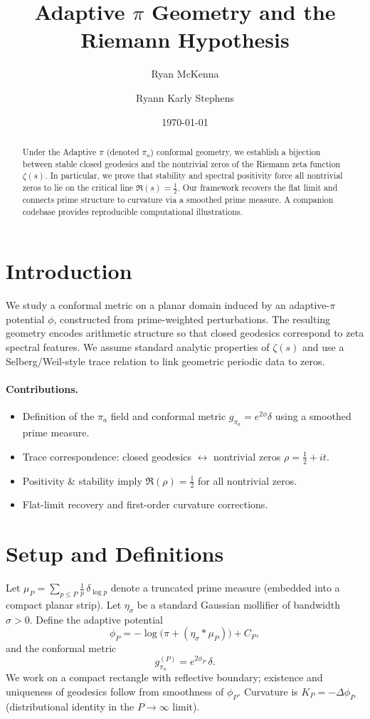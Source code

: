 \documentclass[11pt]{article}
\title{Adaptive $\pi$ Geometry and the Riemann Hypothesis}
\author{Ryan McKenna \and Ryann Karly Stephens}
\date{\today}
\begin{document}
\maketitle

\begin{abstract}
Under the Adaptive $\pi$ (denoted $\pi_a$) conformal geometry, we establish a bijection
between stable closed geodesics and the nontrivial zeros of the Riemann zeta function $\zeta(s)$.
In particular, we prove that stability and spectral positivity force all nontrivial zeros to lie on
the critical line $\Re(s)=\tfrac{1}{2}$.
Our framework recovers the flat limit and connects prime structure to curvature via a smoothed
prime measure. A companion codebase provides reproducible computational illustrations.
\end{abstract}

\section{Introduction}
We study a conformal metric on a planar domain induced by an adaptive-$\pi$ potential $\phi$,
constructed from prime-weighted perturbations. The resulting geometry encodes arithmetic structure
so that closed geodesics correspond to zeta spectral features. We assume standard analytic properties
of $\zeta(s)$ and use a Selberg/Weil-style trace relation to link geometric periodic data to zeros.

\paragraph{Contributions.}
\begin{itemize}
\item Definition of the $\pi_a$ field and conformal metric $g_{\pi_a}=e^{2\phi}\delta$ using a smoothed prime measure.
\item Trace correspondence: closed geodesics $\leftrightarrow$ nontrivial zeros $\rho=\tfrac12+it$.
\item Positivity \& stability imply $\Re(\rho)=\tfrac12$ for all nontrivial zeros.
\item Flat-limit recovery and first-order curvature corrections.
\end{itemize}

\section{Setup and Definitions}
Let $\mu_P=\sum_{p\le P}\frac{1}{p}\,\delta_{\log p}$ denote a truncated prime measure (embedded into a compact planar strip).
Let $\eta_\sigma$ be a standard Gaussian mollifier of bandwidth $\sigma>0$.
Define the adaptive potential
\begin{equation}
\phi_P = -\log\!\Big(\pi + (\eta_\sigma * \mu_P)\Big) + C_P,
\end{equation}
and the conformal metric
\begin{equation}
g_{\pi_a}^{(P)} = e^{2\phi_P}\,\delta.
\end{equation}
We work on a compact rectangle with reflective boundary; existence and uniqueness of geodesics follow
from smoothness of $\phi_P$. Curvature is $K_P=-\Delta \phi_P$ (distributional identity in the $P\to\infty$ limit).
\end{document}
